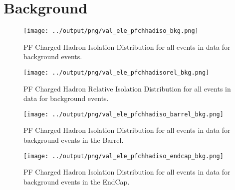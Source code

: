 \documentclass[11pt]{book}
\begin{document}
\section{Background}
\begin{figure}[htb]
\centering
\texttt{[image: ../output/png/val\_ele\_pfchhadiso\_bkg.png]}
\caption{PF Charged Hadron Isolation Distribution for all events in data for background events.}
\label{fig:val_ele_pfchhadiso_bkg}
\end{figure}

\begin{figure}[htb]
\centering
\texttt{[image: ../output/png/val\_ele\_pfchhadisorel\_bkg.png]}
\caption{PF Charged Hadron Relative Isolation Distribution for all events in data for background events.}
\label{fig:val_ele_pfchhadisorel_bkg}
\end{figure}

\begin{figure}[htb]
\centering
\texttt{[image: ../output/png/val\_ele\_pfchhadiso\_barrel\_bkg.png]}
\caption{PF Charged Hadron Isolation Distribution for all events in data for background events in the Barrel.}
\label{fig:val_ele_pfchhadiso_barrel_bkg}
\end{figure}

\begin{figure}[htb]
\centering
\texttt{[image: ../output/png/val\_ele\_pfchhadiso\_endcap\_bkg.png]}
\caption{PF Charged Hadron Isolation Distribution for all events in data for background events in the EndCap.}
\label{fig:val_ele_pfchhadiso_endcap_bkg}
\end{figure}
\end{document}
